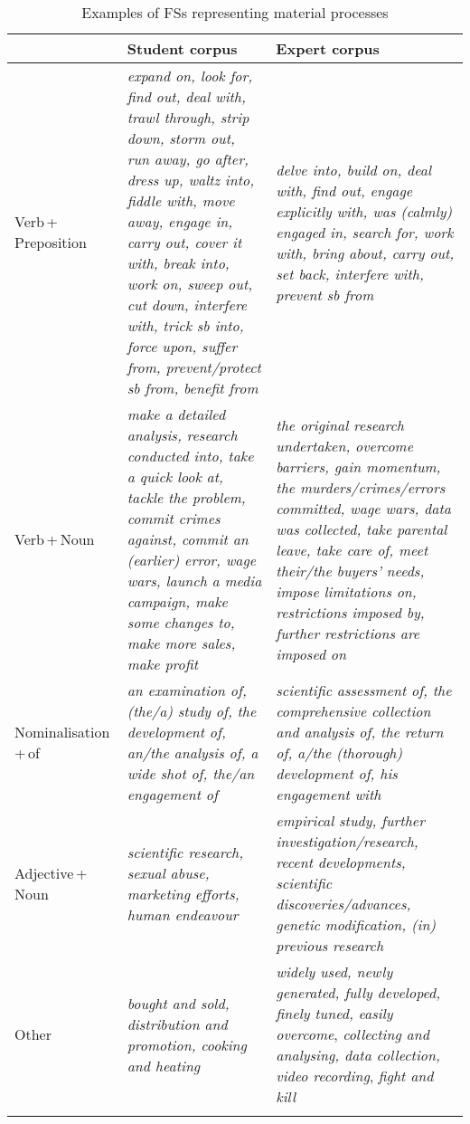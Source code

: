 \documentclass[output=paper]{langscibook}
\begin{document}
\begin{sidewaystable}\small
\begin{tabularx}{\textwidth}{lQQ}
\lsptoprule
& Student corpus & Expert corpus\\\midrule
Verb\,+\,Preposition & \textit{expand on, look for, find out, deal with, trawl through, strip down, storm out, run away, go after, dress up, waltz into, fiddle with, move away, engage in, carry out, cover it with, break into, work on, sweep out, cut down, interfere with, trick sb into, force upon, suffer from, prevent/protect sb from, benefit from} & \textit{delve into, build on, deal with, find out, engage explicitly with, was (calmly) engaged in, search for, work with, bring about, carry out, set back, interfere with, prevent sb from}\\
Verb\,+\,Noun & \textit{make a detailed analysis, research conducted into, take a quick look at, tackle the problem, commit crimes against, commit an (earlier) error, wage wars, launch a media campaign, make some changes to, make more sales, make profit} & \textit{the original research undertaken, overcome barriers, gain momentum, the murders/crimes/errors committed, wage wars, data was collected, take parental leave, take care of, meet their/the buyers’ needs, impose limitations on, restrictions imposed by, further restrictions are imposed on}\\
Nominalisation\,+\,of & \textit{an examination of, (the/a) study of, the development of, an/the analysis of, a wide shot of, the/an engagement of} & \textit{scientific assessment of, the comprehensive collection and analysis of, the return of, a/the (thorough) development of, his engagement with}\\
Adjective\,+\,Noun & \textit{scientific research, sexual abuse, marketing efforts, human endeavour} & \textit{empirical study, further investigation/research, recent developments, scientific discoveries/advances, genetic modification, (in) previous research}\\
Other & \textit{bought and sold, distribution and promotion, cooking and heating} & \textit{widely used, newly generated, fully developed, finely tuned, easily overcome}, \textit{collecting and analysing, data collection, video recording}, \textit{fight and kill}\\
\lspbottomrule
\end{tabularx}
\caption{Examples of FSs representing material processes\label{tab:wang:5}}
\end{sidewaystable}
\end{document}
